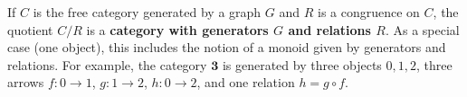 If $C$ is the free category generated by a graph $G$ and $R$ is a congruence on $C$, the quotient $C/R$ is a \textbf{category with generators $G$ and relations $R$}. As a special case (one object), this includes the notion of a monoid given by generators and relations. For example, the category $\mathbf{3}$ is generated by three objects $0, 1, 2$, three arrows $f: 0 \to 1$, $g: 1 \to 2$, $h: 0 \to 2$, and one relation $h = g \circ f$.
